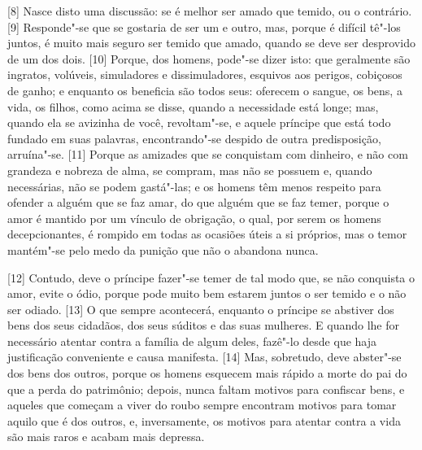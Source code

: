 {[}8{]} Nasce disto uma discussão: se é melhor ser amado que temido, ou
o contrário. {[}9{]} Responde"-se que se gostaria de ser um e outro, mas,
porque é difícil tê"-los juntos, é muito mais seguro ser temido que
amado, quando se deve ser desprovido de um dos dois. {[}10{]} Porque,
dos homens, pode"-se dizer isto: que geralmente são ingratos, volúveis,
simuladores e dissimuladores, esquivos aos perigos, cobiçosos de ganho;
e enquanto os beneficia são todos seus: oferecem o sangue, os bens, a
vida, os filhos, como acima se disse,
quando a necessidade está longe; mas, quando ela se avizinha de você,
revoltam"-se, e aquele príncipe que está todo fundado em suas palavras,
encontrando"-se despido de outra predisposição, arruína"-se. {[}11{]}
Porque as amizades que se conquistam com dinheiro, e não com grandeza e
nobreza de alma, se compram, mas não se possuem e, quando necessárias,
não se podem gastá"-las; e os homens têm menos respeito para ofender a
alguém que se faz amar, do que alguém que se faz temer, porque o amor é
mantido por um vínculo de obrigação, o qual, por serem os homens
decepcionantes, é rompido em todas as
ocasiões úteis a si próprios, mas o temor mantém"-se pelo medo da punição
que não o abandona nunca.

{[}12{]} Contudo, deve o príncipe fazer"-se temer de tal modo que, se não
conquista o amor, evite o ódio, porque pode muito bem estarem juntos o
ser temido e o não ser odiado. {[}13{]} O que sempre acontecerá,
enquanto o príncipe se abstiver dos bens dos seus cidadãos, dos seus
súditos e das suas mulheres. E quando lhe for necessário atentar contra
a família de algum deles, fazê"-lo desde que haja justificação
conveniente e causa manifesta. {[}14{]} Mas, sobretudo, deve abster"-se
dos bens dos outros, porque os homens esquecem mais rápido a morte do
pai do que a perda do patrimônio; depois, nunca faltam motivos para
confiscar bens, e aqueles que começam a viver do roubo sempre encontram
motivos para tomar aquilo que é dos outros, e, inversamente, os motivos
para atentar contra a vida são mais raros e acabam mais depressa.

